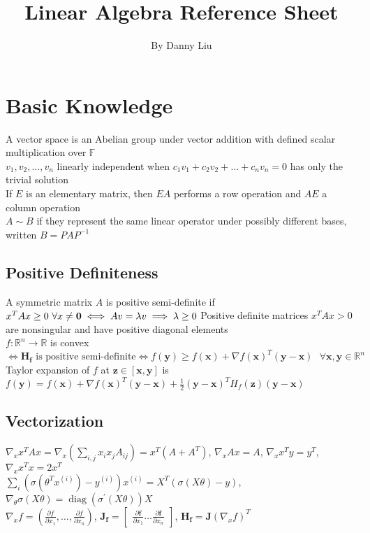 \documentclass{article}
\title{Linear Algebra Reference Sheet}
\author{By Danny Liu}
\date{}
\DeclareMathOperator{\diag}{diag}
\newcommand{\F}{\mathbb{F}}
\newcommand{\real}{\mathbb{R}}
\begin{document}
\maketitle

\section{Basic Knowledge}
A vector space is an Abelian group under vector addition with defined scalar multiplication over $\F$ \\
$v_1, v_2, ..., v_n$ linearly independent when $c_1v_1 + c_2v_2 + \ldots + c_nv_n = 0$ has only the trivial solution\\
If $E$ is an elementary matrix, then $EA$ performs a row operation and $AE$ a column operation \\
$A \sim B$ if they represent the same linear operator under possibly different bases, written ${B = PAP^{-1}}$  

\subsection{Positive Definiteness}
A symmetric matrix $A$ is positive semi-definite if $x^TAx \geq 0 \mbox{ } \forall x \neq \boldsymbol{0} \iff Av = \lambda v \implies \lambda \geq 0 \\$
Positive definite matrices $x^TAx > 0$ are nonsingular and have positive diagonal elements \\
$f: \real^n \rightarrow \real$ is convex $\iff {\boldsymbol{H}_{\boldsymbol{f}} \mbox{ is positive semi-definite} \iff f(\boldsymbol{y}) \geq f(\boldsymbol{x}) + {\nabla f(\boldsymbol{x})}^T (\boldsymbol{y}-\boldsymbol{x}) \mbox{ }\forall \boldsymbol{x}, \boldsymbol{y} \in \real^n }$\\
Taylor expansion of $f$ at $\boldsymbol{z} \in [\boldsymbol{x}, \boldsymbol{y}]$ is $f(\boldsymbol{y}) =  f(\boldsymbol{x}) + {\nabla f(\boldsymbol{x})}^T (\boldsymbol{y}-\boldsymbol{x}) + \frac{1}{2}(\boldsymbol{y}-\boldsymbol{x})^TH_f(\boldsymbol{z})(\boldsymbol{y}-\boldsymbol{x})$

\subsection{Vectorization}
$\nabla_x x^TAx = \nabla_x (\sum_{i, j}x_i x_j A_{ij}) = x^T(A + A^T)$, $\nabla_x Ax = A$, $\nabla_x x^Ty = y^T$, $\nabla_x x^Tx = 2x^T$ \\
$\sum_i(\sigma(\theta^Tx^{(i)}) - y^{(i)})x^{(i)} = X^T(\sigma(X\theta) - y)$, $\nabla_\theta \sigma(X\theta) = \diag(\sigma^\prime (X\theta))X$ \\
$\nabla_x f = (\frac{\partial f}{\partial x_1}, \ldots , \frac{\partial f}{\partial x_n})$, $\boldsymbol{J}_{\boldsymbol{f}} = \begin{bmatrix} \frac{\partial \boldsymbol{f}}{\partial x_1} \ldots \frac{\partial \boldsymbol{f}}{\partial x_n} \end{bmatrix}$, $\boldsymbol{H}_{\boldsymbol{f}} = \boldsymbol{J}(\nabla_x f)^T$
\end{document}
